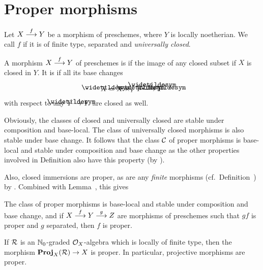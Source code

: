 \documentclass[a4paper,parskip=half,numbers=enddot, DIV=12]{scrreprt}
\begin{document}
\section{Proper morphisms}
\begin{defi}
	Let $X\morphism[f]Y$ be a morphism of preschemes, where $Y$ is locally noetherian. We call $f$  if it is of finite type, separated and \emph{universally closed}.
\end{defi}
\begin{defi}
	A morphism $X\morphism[f]Y$ of preschemes is  if the image of any closed subset if $X$ is closed in $Y$. It is  if all its base changes 
	\begin{align*}
		\snake{X}=X\times_Y\snake{Y}\morphism[\snake{f}]\snake{Y}
	\end{align*}
	with respect to any $\snake{Y}\morphism Y$ are closed as well.
\end{defi}
\begin{rem}
	Obviously, the classes of closed and universally closed are stable under composition and base-local. The class of universally closed morphisms is also stable under base change. It follows that the class $\mathcal{C}$ of proper morphisms is base-local and stable under composition and base change as the other properties involved in Definition also have this property (by \cite[Fact~1.5.7 and Fact~2.2.2]{alggeo1}).
	
	Also, closed immersions are proper, as are any \emph{finite} morphisms (cf.\ Definition~) by \cite[Example~2.6.1]{alggeo1}. Combined with Lemma~, this gives
\end{rem}
\begin{prop}
	The class of proper morphisms is base-local and stable under composition and base change, and if $X\morphism[f]Y\morphism[g]Z$ are morphisms of preschemes such that $gf$ is proper and $g$ separated, then $f$ is proper.
\end{prop}
\begin{prop}
	If $\mathcal{R}$ is an $\mathbb{N}_0$-graded $\mathcal{O}_X$-algebra which is locally of finite type, then the morphism $\PROJ_X(\Rr)\morphism X$ is proper. In particular, projective morphisms are proper.
\end{prop}
\end{document}
